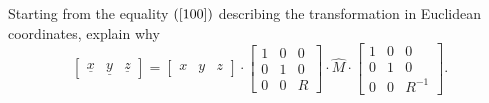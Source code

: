 \documentclass{ximera}
\begin{document}
\begin{problem}
Starting from the equality $\left(\ref{100}\right)$ describing the
transformation in Euclidean coordinates, explain why%
\[
\begin{bmatrix}
\underline{x} & \underline{y} & \underline{z}%
\end{bmatrix}
=\begin{bmatrix}
x & y & z
\end{bmatrix}
  \cdot\begin{bmatrix}
%
1 & 0 & 0\\
0 & 1 & 0\\
0 & 0 & R
\end{bmatrix}
  \cdot\hat{M}\cdot\begin{bmatrix}
%
1 & 0 & 0\\
0 & 1 & 0\\
0 & 0 & R^{-1}%
\end{bmatrix}.
\]

\end{problem}
\end{document}
